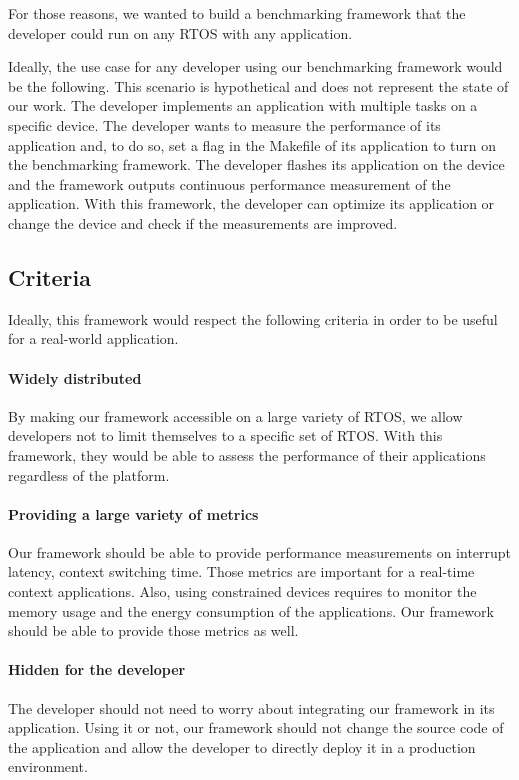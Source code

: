 For those reasons, we wanted to build a benchmarking framework that the developer could run on any RTOS with any application.

Ideally, the use case for any developer using our benchmarking framework would be the following.
This scenario is hypothetical and does not represent the state of our work.
The developer implements an application with multiple tasks on a specific device.
The developer wants to measure the performance of its application and, to do so, set a flag in the Makefile of its application to turn on the benchmarking framework.
The developer flashes its application on the device and the framework outputs continuous performance measurement of the application.
With this framework, the developer can optimize its application or change the device and check if the measurements are improved.

\subsection{Criteria}

Ideally, this framework would respect the following criteria in order to be useful for a real-world application.

\paragraph{Widely distributed}
By making our framework accessible on a large variety of RTOS, we allow developers not to limit themselves to a specific set of RTOS.
With this framework, they would be able to assess the performance of their applications regardless of the platform.

\paragraph{Providing a large variety of metrics}
Our framework should be able to provide performance measurements on interrupt latency, context switching time.
Those metrics are important for a real-time context applications.
Also, using constrained devices requires to monitor the memory usage and the energy consumption of the applications.
Our framework should be able to provide those metrics as well.

\paragraph{Hidden for the developer}
The developer should not need to worry about integrating our framework in its application.
Using it or not, our framework should not change the source code of the application and allow the developer to directly deploy it in a production environment.


